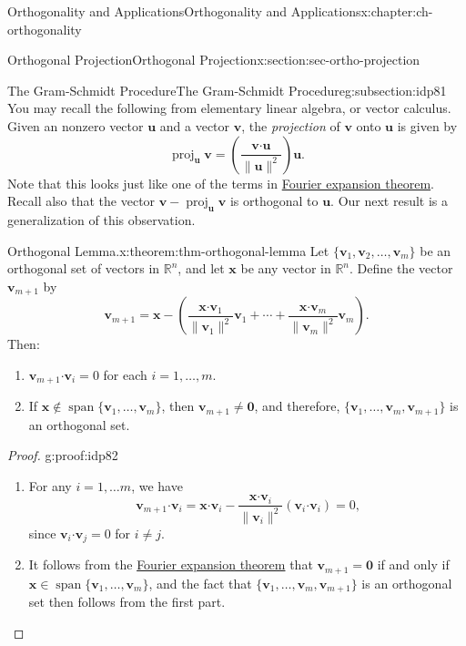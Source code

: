 \documentclass[oneside,10pt,]{book}
\numberwithin{equation}{section}
\newcommand{\spn}{\operatorname{span}}
\newcommand{\R}{\mathbb{R}}
\newcommand{\dotp}{\!\boldsymbol{\cdot}\!}
\newcommand{\len}[1]{\lVert #1\rVert}
\newcommand{\proj}[2]{\operatorname{proj}_{#1}{#2}}
\newcommand{\uu}{\mathbf{u}}
\newcommand{\vv}{\mathbf{v}}
\newcommand{\xx}{\mathbf{x}}
\begin{document}
\begin{chapterptx}{Orthogonality and Applications}{}{Orthogonality and Applications}{}{}{x:chapter:ch-orthogonality}
\begin{sectionptx}{Orthogonal Projection}{}{Orthogonal Projection}{}{}{x:section:sec-ortho-projection}
\begin{introduction}{}
\end{introduction}%
%
%
\typeout{************************************************}
\typeout{************************************************}
%
\begin{subsectionptx}{The Gram-Schmidt Procedure}{}{The Gram-Schmidt Procedure}{}{}{g:subsection:idp81}
You may recall the following from elementary linear algebra, or vector calculus. Given an nonzero vector \(\uu\) and a vector \(\vv\), the \emph{projection} of \(\vv\) onto \(\uu\) is given by%
\begin{equation*}
\proj{\uu}{\vv} = \left(\frac{\vv\dotp\uu}{\len{\uu}^2}\right)\uu\text{.}
\end{equation*}
Note that this looks just like one of the terms in \hyperref[x:theorem:thm-fourier-expansion]{Fourier expansion theorem}. Recall also that the vector \(\vv-\proj{\uu}{\vv}\) is orthogonal to \(\uu\). Our next result is a generalization of this observation.%
\begin{theorem}{Orthogonal Lemma.}{}{x:theorem:thm-orthogonal-lemma}%
Let \(\{\vv_1,\vv_2,\ldots, \vv_m\}\) be an orthogonal set of vectors in \(\R^n\), and let \(\xx\) be any vector in \(\R^n\). Define the vector \(\vv_{m+1}\) by%
\begin{equation*}
\vv_{m+1} = \xx-\left(\frac{\xx\dotp\vv_1}{\len{\vv_1}^2}\vv_1+\cdots + \frac{\xx\dotp\vv_m}{\len{\vv_m}^2}\vv_m\right)\text{.}
\end{equation*}
Then:%
\begin{enumerate}
\item{}\(\vv_{m+1}\dotp \vv_i = 0\) for each \(i=1,\ldots, m\).%
\item{}If \(\xx\notin\spn\{\vv_1,\ldots, \vv_m\}\), then \(\vv_{m+1}\neq \mathbf{0}\), and therefore, \(\{\vv_1,\ldots, \vv_m,\vv_{m+1}\}\) is an orthogonal set.%
\end{enumerate}
%
\end{theorem}
\begin{proof}{}{g:proof:idp82}
%
\begin{enumerate}
\item{}For any \(i=1,\ldots m\), we have%
\begin{equation*}
\vv_{m+1}\dotp\vv_i = \xx\dotp\vv_i - \frac{\xx\dotp\vv_i}{\len{\vv_i}^2}(\vv_i\dotp\vv_i)=0\text{,}
\end{equation*}
since \(\vv_i\dotp\vv_j = 0\) for \(i\neq j\).%
\item{}It follows from the \hyperref[x:theorem:thm-fourier-expansion]{Fourier expansion theorem} that \(\vv_{m+1}=\mathbf{0}\) if and only if \(\xx\in\spn\{\vv_1,\ldots, \vv_m\}\), and the fact that \(\{\vv_1,\ldots, \vv_m,\vv_{m+1}\}\) is an orthogonal set then follows from the first part.%

\end{enumerate}
\end{proof}
\end{subsectionptx}
\end{sectionptx}
\end{chapterptx}
\end{document}
